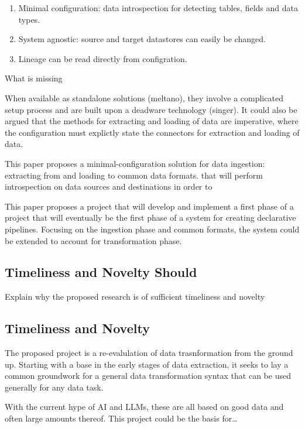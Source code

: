 \begin{enumerate}
\def\labelenumi{\arabic{enumi}.}
\tightlist
\item
  Minimal configuration: data introspection for detecting tables, fields
  and data types.
\item
  System agnostic: source and target datastores can easily be changed.
\item
  Lineage can be read directly from configration.
\end{enumerate}

What is missing

When available as standalone solutions (meltano), they involve a
complicated setup process and are built upon a deadware technology
(singer). It could also be argued that the methods for extracting and
loading of data are imperative, where the configuration must explictly
state the connectors for extraction and loading of data.

This paper proposes a minimal-configuration solution for data ingestion:
extracting from and loading to common data formats. that will perform
introspection on data sources and destinations in order to

This paper proposes a project that will develop and implement a first
phase of a project that will eventually be the first phase of a system
for creating declarative pipelines. Focusing on the ingestion phase and
common formats, the system could be extended to account for
transformation phase.

\subsection{Timeliness and Novelty
Should}\label{timeliness-and-novelty-should}

Explain why the proposed research is of sufficient timeliness and
novelty

\subsection{Timeliness and Novelty}\label{timeliness-and-novelty}

The proposed project is a re-evalulation of data trasnformation from the
ground up. Starting with a base in the early stages of data extraction,
it seeks to lay a common groundwork for a general data transformation
syntax that can be used generally for any data task.

With the current hype of AI and LLMs, these are all based on good data
and often large amounts thereof. This project could be the basis
for\ldots{}

